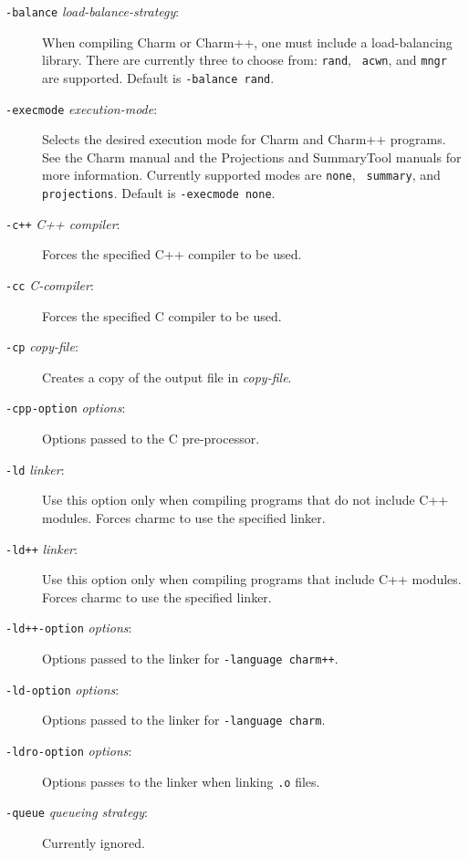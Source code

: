 \begin{description}
\item[{\tt -balance} {\em load-balance-strategy}:]

When compiling Charm or Charm++, one must include a load-balancing
library.  There are currently three to choose from: {\tt rand}, {\tt
acwn}, and {\tt mngr} are supported.  Default is {\tt -balance rand}.

\item[{\tt -execmode} {\em execution-mode}:]

Selects the desired execution mode for Charm and Charm++ programs.
See the Charm manual and the Projections and SummaryTool manuals for
more information.  Currently supported modes are {\tt none}, {\tt
summary}, and {\tt projections}. Default is {\tt -execmode none}.


\item[{\tt -c++} {\em C++ compiler}:]

Forces the specified C++ compiler to be used.

\item[{\tt -cc} {\em C-compiler}:]

Forces the specified C compiler to be used.

\item[{\tt -cp} {\em copy-file}:]

Creates a copy of the output file in {\em copy-file}.

\item[{\tt -cpp-option} {\em options}:]

Options passed to the C pre-processor.

\item[{\tt -ld} {\em linker}:]

Use this option only when compiling programs that do not include C++
modules.  Forces charmc to use the specified linker.

\item[{\tt -ld++} {\em linker}:]

Use this option only when compiling programs that include C++
modules.  Forces charmc to use the specified linker.

\item[{\tt -ld++-option} {\em options}:]

Options passed to the linker for {\tt -language charm++}.

\item[{\tt -ld-option} {\em options}:]

Options passed to the linker for {\tt -language charm}.

\item[{\tt -ldro-option} {\em options}:]

Options passes to the linker when linking {\tt .o} files.

\item[{\tt -queue} {\em queueing strategy}:]

Currently ignored.

\end{description}
